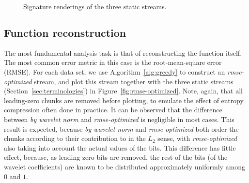 \begin{figure}[h]
  \centering
 	\caption{Signature renderings of the three static streams.}
 	\label{fig:signature-static}
\end{figure}

\subsection{Function reconstruction}
\label{sec:rmse-optimized}

The most fundamental analysis task is that of reconstructing the function itself. The most common
error metric in this case is the root-mean-square error (RMSE). For each data set, we use
Algorithm~\ref{alg:greedy} to construct an \emph{rmse-optimized} stream, and plot this stream
together with the three static streams (Section~\ref{sec:terminologies}) in
Figure~\ref{fig:rmse-optimized}. Note, again, that all leading-zero chunks are removed before
plotting, to emulate the effect of entropy compression often done in practice. It can be observed
that the difference between \emph{by wavelet norm} and \emph{rmse-optimized} is negligible in most
cases. This result is expected, because \emph{by wavelet norm} and \emph{rmse-optimized} both order
the chunks according to their contribution to in the $L_2$ sense, with \emph{rmse-optimized} also
taking into account the actual values of the bits. This difference has little effect, because, as
leading zero bits are removed, the rest of the bits (of the wavelet coefficients) are known to be
distributed approximately uniformly among $0$ and $1$. 

